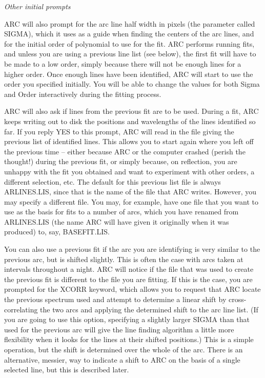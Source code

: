 \goodbreak
\vspace{12pt}
{\it Other initial prompts}

ARC will also prompt for the arc line half width in pixels (the
parameter called SIGMA), which it uses as a guide when finding the
centers of the arc lines, and for the initial order of polynomial to
use for the fit.  
ARC performs running fits, and unless you are using a previous
line list (see below), the first fit will have to be made to a low order,
simply because there will not be enough lines for a higher order.  Once enough
lines have been identified, ARC will start to use the order you specified
initially.  You will be able to change the values for both Sigma and 
Order interactively during the fitting process.

ARC will also ask if lines from the previous fit are to be used.
During a fit, ARC keeps writing out to disk the positions and wavelengths
of the lines identified so far.  If you reply YES to this prompt, ARC will
read in the file giving the previous list of identified lines.  This
allows you to start again where you left off the previous time -- either
because ARC or the computer crashed (perish the thought!) during the
previous fit, or simply because, on reflection, you are unhappy with the
fit you obtained and want to experiment with other orders, a different
selection, etc.  The default for this previous list file is always
ARLINES.LIS, since that is the name of the file that ARC writes.  However,
you may specify a different file.  You may, for example, have one file
that you want to use as the basis for fits to a number of arcs, which you
have renamed from ARLINES.LIS (the name ARC will have given it originally
when it was produced) to, say, BASEFIT.LIS.

You can also use a previous fit if the arc you are
identifying is very similar to the previous arc, but is shifted slightly.
This is often the case with arcs taken at intervals throughout a night.
ARC will notice if the file that was used to create the previous fit is
different to the file you are fitting.  If this is the case, you are prompted
for the XCORR keyword, which allows you to request that ARC locate the
previous spectrum used and attempt to determine a linear shift by 
cross-correlating the two arcs and applying the determined shift to the 
arc line list.  (If you are going to use this option, specifying a slightly
larger SIGMA than that used for the previous arc will give the line
finding algorithm a little more flexibility when it looks for the lines
at their shifted positions.)
This is a simple operation, but the shift is determined
over the whole of the arc.  There is an alternative, messier, way to
indicate a shift to ARC on the basis of a single selected line, but this
is described later.


